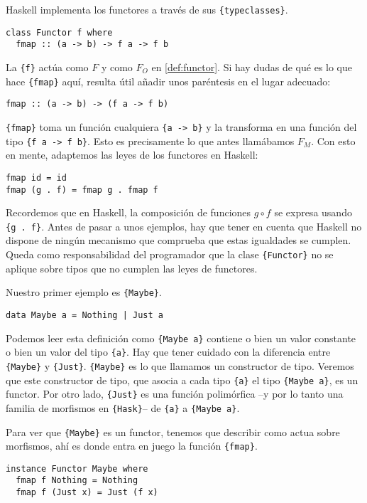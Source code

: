 \documentclass[12pt, twoside]{book}
\newcommand{\code}[1]{\Verb+{#1}+}
\begin{document}
Haskell implementa los functores a través de sus \code{typeclasses}.
\begin{verbatim}
class Functor f where
  fmap :: (a -> b) -> f a -> f b
\end{verbatim}

La \code{f} actúa como $F$ y como $F_O$ en \ref{def:functor}.
Si hay dudas de qué es lo que hace \code{fmap} aquí, resulta útil añadir unos paréntesis en el lugar adecuado:

\begin{verbatim}
fmap :: (a -> b) -> (f a -> f b)
\end{verbatim}

\code{fmap} toma un función cualquiera \code{a -> b} y la transforma en una función del tipo \code{f a -> f b}.
Esto es precisamente lo que antes llamábamos $F_M$.
Con esto en mente, adaptemos las leyes de los functores en Haskell:
\begin{verbatim}
fmap id = id
fmap (g . f) = fmap g . fmap f
\end{verbatim}
Recordemos que en Haskell, la composición de funciones $g \circ f$ se expresa usando \code{g . f}.
Antes de pasar a unos ejemplos, hay que tener en cuenta que Haskell no dispone de ningún mecanismo que comprueba que estas igualdades se cumplen.
Queda como responsabilidad del programador que la clase \code{Functor} no se aplique sobre tipos que no cumplen las leyes de functores. 

\begin{example}
Nuestro primer ejemplo es \code{Maybe}.
\begin{verbatim}
data Maybe a = Nothing | Just a 
\end{verbatim}

Podemos leer esta definición como \code{Maybe a} contiene o bien un valor constante o bien un valor del tipo \code{a}.
Hay que tener cuidado con la diferencia entre \code{Maybe} y \code{Just}.
\code{Maybe} es lo que llamamos un constructor de tipo.
Veremos que este constructor de tipo, que asocia a cada tipo \code{a} el tipo \code{Maybe a}, es un functor.
Por otro lado, \code{Just} es una función polimórfica --y por lo tanto una familia de morfismos en \code{Hask}-- de \code{a} a \code{Maybe a}.

Para ver que \code{Maybe} es un functor, tenemos que describir como actua sobre morfismos, ahí es donde entra en juego la función \code{fmap}.

\begin{verbatim}
instance Functor Maybe where
  fmap f Nothing = Nothing
  fmap f (Just x) = Just (f x) 
\end{verbatim}
\end{example}
\end{document}
